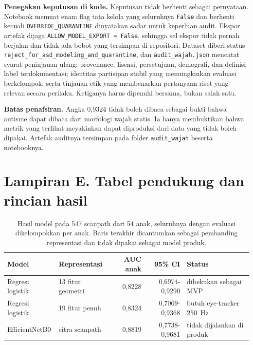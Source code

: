 \documentclass{article}
\begin{document}
\textbf{Penegakan keputusan di kode.} Keputusan tidak berhenti sebagai pernyataan. Notebook
memuat enam flag tata kelola yang seluruhnya \texttt{False} dan berhenti kecuali
\texttt{OVERRIDE\_QUARANTINE} dinyatakan sadar untuk keperluan audit. Ekspor artefak dijaga
\texttt{ALLOW\_MODEL\_EXPORT = False}, sehingga sel ekspor tidak pernah berjalan dan tidak ada
bobot yang tersimpan di repositori. Dataset diberi status
\texttt{reject\_for\_asd\_modeling\_and\_quarantine}, dan \texttt{audit\_wajah.json} mencatat
syarat peninjauan ulang: provenance, lisensi, persetujuan, demografi, dan definisi label
terdokumentasi; identitas partisipan stabil yang memungkinkan evaluasi berkelompok; serta
tinjauan etik yang membenarkan pertanyaan riset yang relevan secara perilaku. Ketiganya harus
dipenuhi bersama, bukan salah satu.

\textbf{Batas penafsiran.} Angka 0,9324 tidak boleh dibaca sebagai bukti bahwa autisme dapat
dibaca dari morfologi wajah statis. Ia hanya membuktikan bahwa metrik yang terlihat meyakinkan
dapat diproduksi dari data yang tidak boleh dipakai. Artefak auditnya tersimpan pada folder
\texttt{audit\_wajah} beserta notebooknya.


\section*{Lampiran E. Tabel pendukung dan rincian hasil}

\begin{table}[h]
\caption{Hasil model pada 547 scanpath dari 54 anak, seluruhnya dengan evaluasi
dikelompokkan per anak. Baris terakhir dicantumkan sebagai pembanding representasi dan tidak
dipakai sebagai model produk.}
\label{tab:model}
\begin{center}
\small
\begin{tabular}{llrrl}
\toprule
\textbf{Model} & \textbf{Representasi} & \textbf{AUC anak} & \textbf{95\% CI} & \textbf{Status} \\
\midrule
Regresi logistik & 13 fitur geometri & 0,8228 & 0,6974-0,9290 & dibekukan sebagai MVP \\
Regresi logistik & 19 fitur penuh    & 0,8324 & 0,7069-0,9368 & butuh eye-tracker 250~Hz \\
EfficientNetB0   & citra scanpath    & 0,8819 & 0,7738-0,9681 & tidak dijalankan di produk \\
\bottomrule
\end{tabular}
\end{center}
\end{table}
\end{document}
